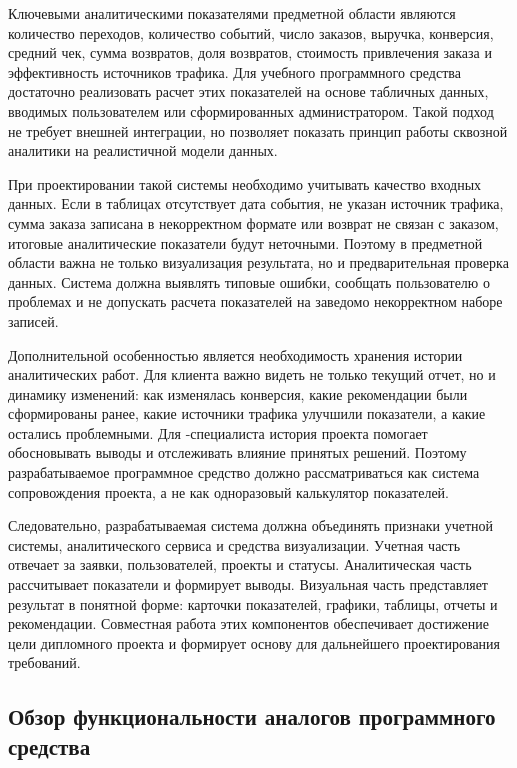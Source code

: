 Ключевыми аналитическими показателями предметной области являются количество переходов, количество событий, число заказов, выручка, конверсия, средний чек, сумма возвратов, доля возвратов, стоимость привлечения заказа и эффективность источников трафика. Для учебного программного средства достаточно реализовать расчет этих показателей на основе табличных данных, вводимых пользователем или сформированных администратором. Такой подход не требует внешней интеграции, но позволяет показать принцип работы сквозной аналитики на реалистичной модели данных.

При проектировании такой системы необходимо учитывать качество входных данных. Если в таблицах отсутствует дата события, не указан источник трафика, сумма заказа записана в некорректном формате или возврат не связан с заказом, итоговые аналитические показатели будут неточными. Поэтому в предметной области важна не только визуализация результата, но и предварительная проверка данных. Система должна выявлять типовые ошибки, сообщать пользователю о проблемах и не допускать расчета показателей на заведомо некорректном наборе записей.

Дополнительной особенностью является необходимость хранения истории аналитических работ. Для клиента важно видеть не только текущий отчет, но и динамику изменений: как изменялась конверсия, какие рекомендации были сформированы ранее, какие источники трафика улучшили показатели, а какие остались проблемными. Для -специалиста история проекта помогает обосновывать выводы и отслеживать влияние принятых решений. Поэтому разрабатываемое программное средство должно рассматриваться как система сопровождения проекта, а не как одноразовый калькулятор показателей.

Следовательно, разрабатываемая система должна объединять признаки учетной системы, аналитического сервиса и средства визуализации. Учетная часть отвечает за заявки, пользователей, проекты и статусы. Аналитическая часть рассчитывает показатели и формирует выводы. Визуальная часть представляет результат в понятной форме: карточки показателей, графики, таблицы, отчеты и рекомендации. Совместная работа этих компонентов обеспечивает достижение цели дипломного проекта и формирует основу для дальнейшего проектирования требований.

\subsection{Обзор функциональности аналогов программного средства}


